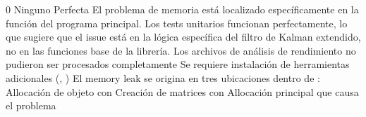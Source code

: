 {}
\markdownRendererSectionEnd \markdownRendererSectionBegin
{}\markdownRendererInterblockSeparator
{}\markdownRendererUlBeginTight
\markdownRendererUlItem {} 0\markdownRendererUlItemEnd 
\markdownRendererUlItem {} Ninguno\markdownRendererUlItemEnd 
\markdownRendererUlItem {} Perfecta\markdownRendererUlItemEnd 
\markdownRendererUlEndTight \markdownRendererInterblockSeparator
{} El problema de memoria está localizado específicamente en la función  del programa principal. Los tests unitarios funcionan perfectamente, lo que sugiere que el issue está en la lógica específica del filtro de Kalman extendido, no en las funciones base de la librería.\markdownRendererInterblockSeparator
{}
\markdownRendererSectionEnd 
\markdownRendererSectionEnd \markdownRendererSectionBegin
{}\markdownRendererInterblockSeparator
{}\markdownRendererSectionBegin
{}\markdownRendererInterblockSeparator
{}\markdownRendererUlBeginTight
\markdownRendererUlItem Los archivos de análisis de rendimiento no pudieron ser procesados completamente\markdownRendererUlItemEnd 
\markdownRendererUlItem Se requiere instalación de herramientas adicionales (, )\markdownRendererUlItemEnd 
\markdownRendererUlEndTight \markdownRendererInterblockSeparator
{}
\markdownRendererSectionEnd 
\markdownRendererSectionEnd \markdownRendererSectionBegin
{}\markdownRendererInterblockSeparator
{}El memory leak se origina en tres ubicaciones dentro de :\markdownRendererInterblockSeparator
{}\markdownRendererOlBeginTight
{} Allocación de objeto con \markdownRendererOlItemEnd 
{} Creación de matrices con  \markdownRendererOlItemEnd 
{} Allocación principal que causa el problema\markdownRendererOlItemEnd 
